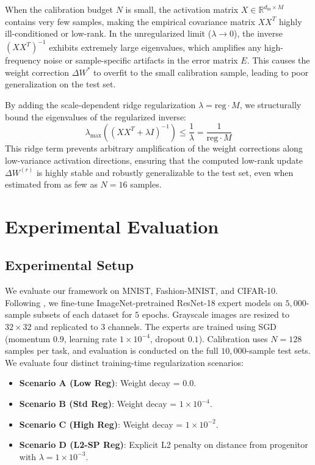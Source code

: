 \documentclass{article}
\theoremstyle{plain}
\theoremstyle{definition}
\theoremstyle{remark}
\begin{document}
When the calibration budget $N$ is small, the activation matrix $X \in \mathbb{R}^{d_{\text{in}} \times M}$ contains very few samples, making the empirical covariance matrix $X X^T$ highly ill-conditioned or low-rank. In the unregularized limit ($\lambda \to 0$), the inverse $(X X^T)^{-1}$ exhibits extremely large eigenvalues, which amplifies any high-frequency noise or sample-specific artifacts in the error matrix $E$. This causes the weight correction $\Delta W^*$ to overfit to the small calibration sample, leading to poor generalization on the test set.

By adding the scale-dependent ridge regularization $\lambda = \text{reg} \cdot M$, we structurally bound the eigenvalues of the regularized inverse:
\begin{equation}
    \lambda_{\max}\left( (X X^T + \lambda I)^{-1} \right) \le \frac{1}{\lambda} = \frac{1}{\text{reg} \cdot M}
\end{equation}
This ridge term prevents arbitrary amplification of the weight corrections along low-variance activation directions, ensuring that the computed low-rank update $\Delta W^{(r)}$ is highly stable and robustly generalizable to the test set, even when estimated from as few as $N=16$ samples.

\section{Experimental Evaluation}

\subsection{Experimental Setup}
We evaluate our framework on MNIST, Fashion-MNIST, and CIFAR-10. Following \cite{Anonymous2024c}, we fine-tune ImageNet-pretrained ResNet-18 expert models on $5,000$-sample subsets of each dataset for $5$ epochs. Grayscale images are resized to $32\times32$ and replicated to $3$ channels. The experts are trained using SGD (momentum $0.9$, learning rate $1\times10^{-4}$, dropout $0.1$). Calibration uses $N=128$ samples per task, and evaluation is conducted on the full $10,000$-sample test sets. We evaluate four distinct training-time regularization scenarios:
\begin{itemize}\itemsep=0pt \parsep=0pt
    \item \textbf{Scenario A (Low Reg)}: Weight decay = $0.0$.
    \item \textbf{Scenario B (Std Reg)}: Weight decay = $1\times10^{-4}$.
    \item \textbf{Scenario C (High Reg)}: Weight decay = $1\times10^{-2}$.
    \item \textbf{Scenario D (L2-SP Reg)}: Explicit L2 penalty on distance from progenitor with $\lambda = 1\times10^{-3}$.
\end{itemize}
\end{document}
